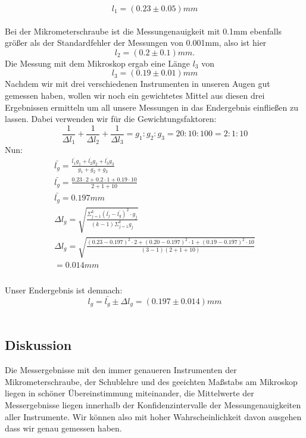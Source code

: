 \documentclass{article}
\begin{document}
\begin{equation}
l_1=(0.23\pm0.05)mm
\end{equation}
\\
Bei der Mikrometerschraube ist die Messungenauigkeit mit 0.1mm ebenfalls größer als der Standardfehler der Messungen von 0.001mm, also ist hier \\ 
\begin{equation}
l_2=(0.2\pm0.1)mm. 
\end{equation}
Die Messung mit dem Mikroskop ergab eine Länge $l_3$ von
\begin{equation}
l_3=(0.19 \pm 0.01) mm
\end{equation}
Nachdem wir mit drei verschiedenen Instrumenten in unseren Augen gut gemessen haben, wollen wir noch ein gewichtetes Mittel aus diesen drei Ergebnissen ermitteln um all unsere Messungen in das Endergebnis einfließen zu lassen. Dabei verwenden wir für die Gewichtungsfaktoren:
\begin{equation}
\frac{1}{\Delta l_1}+\frac{1}{\Delta l_2}+\frac{1}{\Delta l_3}=g_1:g_2:g_3=20:10:100=2:1:10
\end{equation}
Nun:
\begin{gather*}
\bar{l_g}=\frac{\bar{l_1}g_1+\bar{l_2}g_2+\bar{l_3}g_3}{g_1+g_2+g_3} \\
\bar{l_g}=\frac{0.23\cdot2+0.2\cdot1+0.19\cdot10}{2+1+10} \\
\bar{l_g}=0.197mm \\
\Delta l_g= \sqrt{\frac{\Sigma^k_{j=1}( \bar{l_j} -\bar{l_g} )^2 \cdot g_j}{(k-1)\Sigma^k_{j=1}g_j} } \\
\Delta l_g= \sqrt{\frac{(0.23-0.197)^2\cdot2+(0.20-0.197)^2\cdot1+(0.19-0.197)^2\cdot10}{(3-1)(2+1+10)}}\\ = 0.014mm \\
\end{gather*}\\
Unser Endergebnis ist demnach:\\
\begin{equation}
l_g=\bar{l_g}\pm\Delta l_g = (0.197\pm0.014)mm
\end{equation}\\
\subsection{Diskussion}
Die Messergebnisse mit den immer genaueren Instrumenten der Mikrometerschraube, der Schublehre und des geeichten Maßstabs am Mikroskop liegen in schöner Übereinstimmung miteinander, die Mittelwerte der Messergebnisse liegen innerhalb der Konfidenzintervalle der Messungenauigkeiten aller Instrumente. Wir können also mit hoher Wahrscheinlichkeit davon ausgehen dass wir genau gemessen haben.
\end{document}

